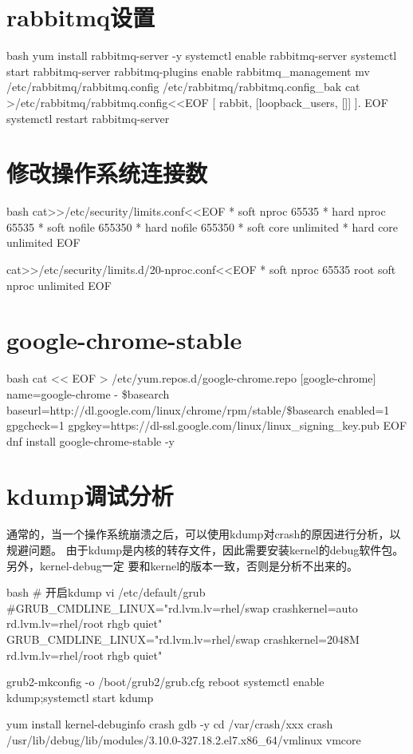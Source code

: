 \section{rabbitmq设置}
\begin{code-block}{bash}
yum install rabbitmq-server -y
systemctl enable rabbitmq-server
systemctl start rabbitmq-server
rabbitmq-plugins enable rabbitmq_management
mv /etc/rabbitmq/rabbitmq.config /etc/rabbitmq/rabbitmq.config_bak
cat >/etc/rabbitmq/rabbitmq.config<<EOF
[
{rabbit, [{loopback_users, []}]}
].
EOF
systemctl restart rabbitmq-server
\end{code-block}

\section{修改操作系统连接数}
\begin{code-block}{bash}
cat>>/etc/security/limits.conf<<EOF
*               soft    nproc           65535
*               hard    nproc           65535
*               soft    nofile          655350
*               hard    nofile          655350
*               soft    core            unlimited
*               hard    core            unlimited
EOF

cat>>/etc/security/limits.d/20-nproc.conf<<EOF
*          soft    nproc     65535
root       soft    nproc     unlimited
EOF
\end{code-block}

\section{google-chrome-stable}
\begin{code-block}{bash}
cat << EOF > /etc/yum.repos.d/google-chrome.repo
[google-chrome]
name=google-chrome - \$basearch
baseurl=http://dl.google.com/linux/chrome/rpm/stable/\$basearch
enabled=1
gpgcheck=1
gpgkey=https://dl-ssl.google.com/linux/linux_signing_key.pub
EOF
dnf install google-chrome-stable -y
\end{code-block}

\section{kdump调试分析}
通常的，当一个操作系统崩溃之后，可以使用kdump对crash的原因进行分析，以规避问题。
由于kdump是内核的转存文件，因此需要安装kernel的debug软件包。另外，kernel-debug一定
要和kernel的版本一致，否则是分析不出来的。
\begin{code-block}{bash}
# 开启kdump
vi /etc/default/grub
#GRUB_CMDLINE_LINUX="rd.lvm.lv=rhel/swap crashkernel=auto rd.lvm.lv=rhel/root rhgb quiet"
GRUB_CMDLINE_LINUX="rd.lvm.lv=rhel/swap crashkernel=2048M rd.lvm.lv=rhel/root rhgb quiet"

grub2-mkconfig -o /boot/grub2/grub.cfg
reboot
systemctl enable kdump;systemctl start kdump

yum install kernel-debuginfo crash gdb -y
cd /var/crash/xxx
crash /usr/lib/debug/lib/modules/3.10.0-327.18.2.el7.x86_64/vmlinux vmcore
\end{code-block}

